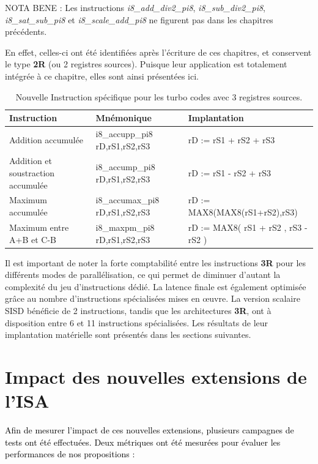 \documentclass[../main.tex]{subfiles}
\begin{document}
NOTA BENE : Les instructions \textit{i8\_add\_div2\_pi8}, \textit{i8\_sub\_div2\_pi8}, \textit{i8\_sat\_sub\_pi8} et \textit{i8\_scale\_add\_pi8} ne figurent pas dans les chapitres précédents.

En effet, celles-ci ont été identifiées après l'écriture de ces chapitres, et conservent le type \textbf{2R} (ou 2 registres sources).
Puisque leur application est totalement intégrée à ce chapitre, elles sont ainsi présentées ici.
\begin{table}[tb]
    \centering
    \footnotesize
      \begin{tabular}{l || l l }
      \hline
        \textbf{Instruction} & \textbf{Mnémonique}    & \textbf{Implantation} \\ 
        \hline   
        Addition accumulée                  & i8\_accupp\_pi8 rD,rS1,rS2,rS3    & rD := rS1 + rS2 + rS3                \\
        Addition et soustraction accumulée  & i8\_accump\_pi8 rD,rS1,rS2,rS3    & rD := rS1 - rS2 + rS3                \\
        Maximum accumulée                   & i8\_accumax\_pi8 rD,rS1,rS2,rS3   & rD := MAX8(MAX8(rS1+rS2),rS3)      \\
        Maximum entre A+B et C-B            & i8\_maxpm\_pi8 rD,rS1,rS2,rS3     & rD := MAX8( rS1 + rS2 , rS3 - rS2 ) \\
        \hline
      \end{tabular}
    \caption{Nouvelle Instruction spécifique pour les turbo codes avec 3 registres sources.}
    \label{tab:instrus_turbo_3reg}
    \end{table}
Il est important de noter la forte comptabilité entre les instructions \textbf{3R} pour les différents modes de parallélisation, ce qui permet de diminuer d'autant la complexité du jeu d'instructions dédié.
La latence finale est également optimisée grâce au nombre d'instructions spécialisées mises en œuvre.
La version scalaire SISD bénéficie de 2 instructions, tandis que les architectures \textbf{3R}, ont à disposition entre 6 et 11 instructions spécialisées.
Les résultats de leur implantation matérielle sont présentés dans les sections suivantes.
%
%
%
% 
%
\section{Impact des nouvelles extensions de l'ISA}
%
%
%
%
%
\textcolor{black}{Afin de mesurer l'impact de ces nouvelles extensions, plusieurs campagnes de tests ont été effectuées. 
Deux métriques ont été mesurées pour évaluer les performances de nos propositions :}
\end{document}
